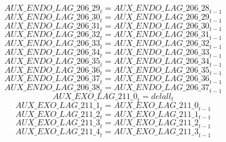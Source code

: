 \begin{dmath}
{AUX\_ENDO\_LAG\_206\_29}_{t}={AUX\_ENDO\_LAG\_206\_28}_{t-1}
\end{dmath}
\begin{dmath}
{AUX\_ENDO\_LAG\_206\_30}_{t}={AUX\_ENDO\_LAG\_206\_29}_{t-1}
\end{dmath}
\begin{dmath}
{AUX\_ENDO\_LAG\_206\_31}_{t}={AUX\_ENDO\_LAG\_206\_30}_{t-1}
\end{dmath}
\begin{dmath}
{AUX\_ENDO\_LAG\_206\_32}_{t}={AUX\_ENDO\_LAG\_206\_31}_{t-1}
\end{dmath}
\begin{dmath}
{AUX\_ENDO\_LAG\_206\_33}_{t}={AUX\_ENDO\_LAG\_206\_32}_{t-1}
\end{dmath}
\begin{dmath}
{AUX\_ENDO\_LAG\_206\_34}_{t}={AUX\_ENDO\_LAG\_206\_33}_{t-1}
\end{dmath}
\begin{dmath}
{AUX\_ENDO\_LAG\_206\_35}_{t}={AUX\_ENDO\_LAG\_206\_34}_{t-1}
\end{dmath}
\begin{dmath}
{AUX\_ENDO\_LAG\_206\_36}_{t}={AUX\_ENDO\_LAG\_206\_35}_{t-1}
\end{dmath}
\begin{dmath}
{AUX\_ENDO\_LAG\_206\_37}_{t}={AUX\_ENDO\_LAG\_206\_36}_{t-1}
\end{dmath}
\begin{dmath}
{AUX\_ENDO\_LAG\_206\_38}_{t}={AUX\_ENDO\_LAG\_206\_37}_{t-1}
\end{dmath}
\begin{dmath}
{AUX\_EXO\_LAG\_211\_0}_{t}={delall}_{t}
\end{dmath}
\begin{dmath}
{AUX\_EXO\_LAG\_211\_1}_{t}={AUX\_EXO\_LAG\_211\_0}_{t-1}
\end{dmath}
\begin{dmath}
{AUX\_EXO\_LAG\_211\_2}_{t}={AUX\_EXO\_LAG\_211\_1}_{t-1}
\end{dmath}
\begin{dmath}
{AUX\_EXO\_LAG\_211\_3}_{t}={AUX\_EXO\_LAG\_211\_2}_{t-1}
\end{dmath}
\begin{dmath}
{AUX\_EXO\_LAG\_211\_4}_{t}={AUX\_EXO\_LAG\_211\_3}_{t-1}
\end{dmath}
